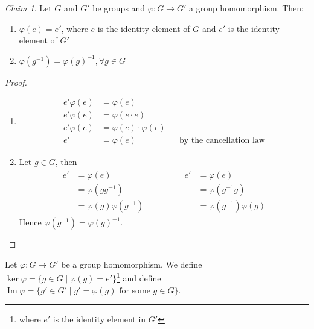 \documentclass[12pt,letterpaper,DIV=11,final]{scrartcl}
\theoremstyle{plain}
\theoremstyle{definition}
\theoremstyle{remark}
\newtheorem{claim}{Claim}
\DeclareMathOperator{\ima}{Im}
\begin{document}
\begin{claim}\label{claim:grouphomomorphism_id}
  Let $G$ and $G'$ be groups and $\varphi: G \to G'$ a group homomorphism.
  Then: \begin{enumerate}
    \item $\varphi(e) = e'$, where $e$ is the identity element of $G$ and $e'$ is the identity element of $G'$
    \item $\varphi(g^{-1}) = {\varphi(g)}^{-1}, \forall g \in G$
  \end{enumerate}

  \begin{proof}\leavevmode
    \begin{enumerate}
      \item
        \begin{align*}
          e' \varphi(e) &= \varphi(e) \\
          e' \varphi(e) &= \varphi(e \cdot e) \\
          e' \varphi(e) &= \varphi(e) \cdot \varphi(e) \\
          e'            &= \varphi(e) && \text{by the cancellation law}
        \end{align*}
      \item Let $g \in G$, then
        \begin{align*}
          \begin{aligned}
            e' &= \varphi(e) \\
               &= \varphi(g g^{-1}) \\
               &= \varphi(g) \varphi(g^{-1})
          \end{aligned}
          \qquad \qquad
          \begin{aligned}
            e' &= \varphi(e) \\
               &= \varphi(g^{-1} g) \\
               &= \varphi(g^{-1}) \varphi(g)
          \end{aligned}
        \end{align*}
        Hence $\varphi(g^{-1}) = {\varphi(g)}^{-1}$. \qedhere
    \end{enumerate}
  \end{proof}
\end{claim}

Let $\varphi: G \to G'$ be a group homomorphism.
We define $\ker \varphi = \{ g \in G \mid \varphi(g) = e' \}$\footnote{where $e'$ is the identity element in $G'$}
and define $\ima \varphi = \{ g' \in G' \mid g' = \varphi(g) \text{ for some } g \in G \}$.
\end{document}
